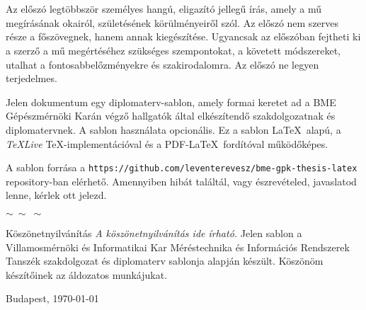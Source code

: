 

\selecthungarian

\chapter*{\eloszo}

Az előszó legtöbbször személyes hangú, eligazító jellegű írás, amely a mű megírásának okairól, születésének körülményeiről szól. Az előszó nem szerves része a főszövegnek, hanem annak kiegészítése.
Ugyancsak az előszóban fejtheti ki a szerző a mű megértéséhez szükséges szempontokat, a követett módszereket, utalhat a fontosabbelőzményekre és szakirodalomra.
Az előszó ne legyen terjedelmes.

\begin{flushleft}
Jelen dokumentum egy diplomaterv-sablon, amely formai keretet ad a BME Gépészmérnöki Karán végző hallgatók által elkészítendő szakdolgozatnak és diplomatervnek. A sablon használata opcionális. Ez a sablon \LaTeX~alapú, a \emph{TeXLive} \TeX-implementációval és a PDF-\LaTeX~fordítóval működőképes.

A sablon forrása a \verb+https://github.com/leventerevesz/bme-gpk-thesis-latex+ repository-ban elérhető.  Amennyiben hibát találtál, vagy észrevételed, javaslatod lenne, kérlek ott jelezd.
\end{flushleft}


\begin{center}
    $\sim \: \sim \: \sim$
\end{center}

\begin{flushleft}
Köszönetnyilvánítás \emph{A köszönetnyilvánítás ide írható.} Jelen sablon a Villamosmérnöki és Informatikai Kar Méréstechnika és Információs Rendszerek Tanszék szakdolgozat és diplomaterv sablonja alapján készült. Köszönöm készítőinek az áldozatos munkájukat.
\end{flushleft}

\vspace{0.5cm}

\begin{flushleft}
{Budapest, \today}
\end{flushleft}

\begin{flushright}
\emph{\szerzo}
\end{flushright}

\vfill
